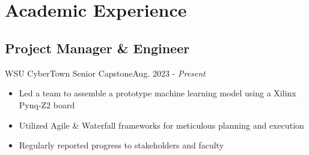 \\ \\ \section{Academic Experience}
\subsection{Project Manager \& Engineer}{WSU CyberTown Senior Capstone}{Aug. 2023 - \textit{Present}}
\begin{itemize}
    \item Led a team to assemble a prototype machine learning model using a Xilinx Pynq-Z2 board
    \item Utilized Agile \& Waterfall frameworks for meticulous planning and execution
    \item Regularly reported progress to stakeholders and faculty
\end{itemize}

